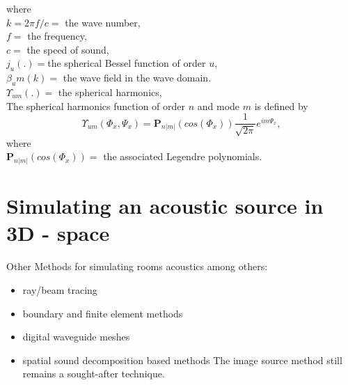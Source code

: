 where\\
$k=2\pi f/c=$ the wave number,\\
$f=$ the frequency,\\
$c=$ the speed of sound,\\
$j_u(.)=$the spherical Bessel function of order $u$,\\
$\beta_um(k)=$ the wave field in the wave domain.\\ 
$\Upsilon_{um}(.)=$ the spherical harmonics,\\
The spherical harmonics function of order $n$ and mode $m$ is defined by\cite{Samarasinghe2018}
\begin{equation}
    \Upsilon_{um}(\Phi_x,\Psi_x) = \mathbf{P}_{n|m|}(cos(\Phi_x))\frac{1}{\sqrt{2\pi}}e^{im\Psi_x},
\end{equation}
where\\
$\mathbf{P}_{n|m|}(cos(\Phi_x))=$ the associated Legendre polynomials.
\section{Simulating an acoustic source in 3D - space}
Other Methods for simulating rooms acoustics among others:
\begin{itemize}
    \item ray/beam tracing
    \item boundary and finite element methods
    \item digital waveguide meshes
    \item spatial sound decomposition based methods
The image source method still remains a sought-after technique.\cite{Samarasinghe2018}
\end{itemize}

